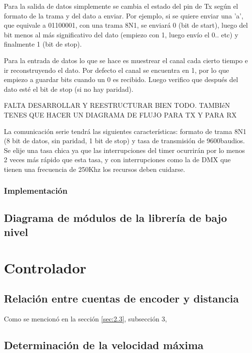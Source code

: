 Para la salida de datos simplemente se cambia el estado del pin de Tx según el formato de la trama y del dato a enviar. Por ejemplo, si se quiere enviar una 'a', que equivale a 01100001, con una trama 8N1, se enviará 0 (bit de start), luego del bit menos al más significativo del dato (empiezo con 1, luego envío el 0.. etc) y finalmente 1 (bit de stop).

Para la entrada de datos lo que se hace es muestrear el canal cada cierto tiempo e ir reconstruyendo el dato. Por defecto el canal se encuentra en 1, por lo que empiezo a guardar bits cuando un 0 es recibido. Luego verifico que después del dato esté el bit de stop (si no hay paridad).

\textcolor{FIXME}{FALTA DESARROLLAR Y REESTRUCTURAR BIEN TODO. TAMBIéN TENES QUE HACER UN DIAGRAMA DE FLUJO PARA TX Y PARA RX}

La comunicación serie tendrá las siguientes características: formato de trama 8N1 (8 bit de datos, sin paridad, 1 bit de stop) y tasa de transmisión de 9600baudios. Se elije una tasa chica ya que las interrupciones del timer ocurrirán por lo menos 2 veces más rápido que esta tasa, y con interrupciones como la de DMX que tienen una frecuencia de 250Khz los recursos deben cuidarse.

\subsubsection{Implementación}





\subsection{Diagrama de módulos de la librería de bajo nivel}


\section{Controlador} \label{sec:\thesection}

\subsection{Relación entre cuentas de encoder y distancia}
Como se mencionó en la sección \ref{sec:2.3}, subsección 3, 

\subsection{Determinación de la velocidad máxima}

